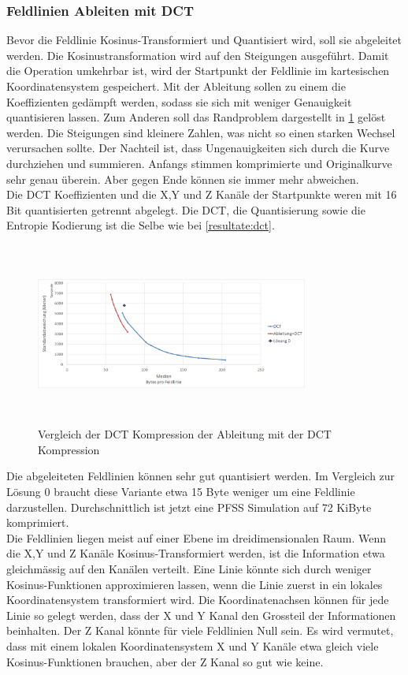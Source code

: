 \subsubsection{Feldlinien Ableiten mit DCT}\label{resultate:dct:ableitung_dct}
Bevor die Feldlinie Kosinus-Transformiert und Quantisiert wird, soll sie abgeleitet werden. Die Kosinustransformation wird auf den Steigungen ausgeführt. Damit die Operation umkehrbar ist, wird der Startpunkt der Feldlinie im kartesischen Koordinatensystem gespeichert. Mit der Ableitung sollen zu einem die Koeffizienten gedämpft werden, sodass sie sich mit weniger Genauigkeit quantisieren lassen. Zum Anderen soll das Randproblem dargestellt in \ref{resultate:loesung1:dct:artefakte} gelöst werden. Die Steigungen sind kleinere Zahlen, was nicht so einen starken Wechsel verursachen sollte. Der Nachteil ist, dass Ungenauigkeiten sich durch die Kurve durchziehen und summieren. Anfangs stimmen komprimierte und Originalkurve sehr genau überein. Aber gegen Ende können sie immer mehr abweichen.\\
Die DCT Koeffizienten und die X,Y und Z Kanäle der Startpunkte weren mit 16 Bit quantisierten getrennt abgelegt. Die DCT, die Quantisierung sowie die Entropie Kodierung ist die Selbe wie bei \ref{resultate:dct}.
\begin{figure}[!htbp]
	\center
	\includegraphics[width=0.8\textwidth,height=6cm,keepaspectratio]{./pictures/resultate/loesung1/loesung1-1/loesung1_1.png}
	\caption{Vergleich der DCT Kompression der Ableitung mit der DCT Kompression}
	\label{resultate:loesung1:dct:artefakte}
\end{figure}
Die abgeleiteten Feldlinien können sehr gut quantisiert werden. Im Vergleich zur Lösung 0 braucht diese Variante etwa 15 Byte weniger um eine Feldlinie darzustellen. Durchschnittlich ist jetzt eine PFSS Simulation auf 72 KiByte komprimiert.\\
Die Feldlinien liegen meist auf einer Ebene im dreidimensionalen Raum. Wenn die X,Y und Z Kanäle Kosinus-Transformiert werden, ist die Information etwa gleichmässig auf den Kanälen verteilt. Eine Linie könnte sich durch weniger Kosinus-Funktionen approximieren lassen, wenn die Linie zuerst in ein lokales Koordinatensystem transformiert wird. Die Koordinatenachsen können für jede Linie so gelegt werden, dass der X und Y Kanal den Grossteil der Informationen beinhalten. Der Z Kanal könnte für viele Feldlinien Null sein. Es wird vermutet, dass mit einem lokalen Koordinatensystem X und Y Kanäle etwa gleich viele Kosinus-Funktionen brauchen, aber der Z Kanal so gut wie keine. 


